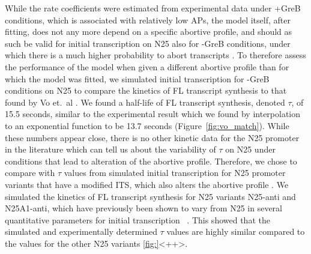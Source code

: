 While the rate coefficients were estimated from experimental data under +GreB
conditions, which is associated with relatively low APs, the model itself,
after fitting, does not any more depend on a specific abortive profile, and
should as such be valid for initial transcription on N25 also for -GreB
conditions, under which there is a much higher probability to abort
transcripts \cite{hsu_initial_2006}. To therefore assess the performance of
the model when given a different abortive profile than for which the model was
fitted, we simulated initial transcription for -GreB conditions on N25 to
compare the kinetics of FL transcript synthesis to that found by Vo et.\
al \cite{vo_vitro_2003-1}. We found a half-life of FL transcript synthesis,
denoted $\tau$, of 15.5 seconds, similar to the experimental result which we
found by interpolation to an exponential function to be 13.7 seconds
(Figure~\ref{fig:vo_match}). While these numbers appear close, there is no
other kinetic data for the N25 promoter in the literature which can tell us
about the variability of $\tau$ on N25 under conditions that lead to
alteration of the abortive profile. Therefore, we chose to compare with
$\tau$ values from simulated initial transcription for N25 promoter variants
that have a modified ITS, which also alters the abortive profile
\cite{hsu_initial_2006}. We simulated the kinetics of FL transcript synthesis
for N25 variants N25-anti and N25A1-anti, which have previously been shown to
vary from N25 in several quantitative parameters for initial transcription~
\cite{hsu_initial_2006,chan_anti-initial_2001,kammerer_functional_1986}. This
showed that the simulated and experimentally determined $\tau$ values are
highly similar compared to the values for the other N25 variants
\ref{fig:}<++>.

